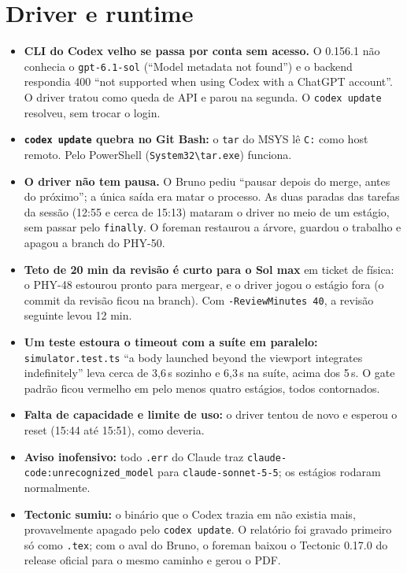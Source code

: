 \documentclass[11pt,a4paper]{article}
\begin{document}
\section{Driver e runtime}
\begin{itemize}
  \item \textbf{CLI do Codex velho se passa por conta sem acesso.} O 0.156.1
        não conhecia o \texttt{gpt-6.1-sol} (``Model metadata not found'') e o
        backend respondia 400 ``not supported when using Codex with a ChatGPT
        account''. O driver tratou como queda de API e parou na segunda. O
        \texttt{codex update} resolveu, sem trocar o login.
  \item \textbf{\texttt{codex update} quebra no Git Bash:} o \texttt{tar} do
        MSYS lê \texttt{C:} como host remoto. Pelo PowerShell
        (\texttt{System32\textbackslash tar.exe}) funciona.
  \item \textbf{O driver não tem pausa.} O Bruno pediu ``pausar depois do
        merge, antes do próximo''; a única saída era matar o processo. As duas
        paradas das tarefas da sessão (12:55 e cerca de 15:13) mataram o driver
        no meio de um estágio, sem passar pelo \texttt{finally}. O foreman
        restaurou a árvore, guardou o trabalho e apagou a branch do PHY-50.
  \item \textbf{Teto de 20 min da revisão é curto para o Sol max} em ticket de
        física: o PHY-48 estourou pronto para mergear, e o driver jogou o
        estágio fora (o commit da revisão ficou na branch). Com
        \texttt{-ReviewMinutes 40}, a revisão seguinte levou 12 min.
  \item \textbf{Um teste estoura o timeout com a suíte em paralelo:}
        \texttt{simulator.test.ts} ``a body launched beyond the viewport
        integrates indefinitely'' leva cerca de 3,6\,s sozinho e 6,3\,s na suíte,
        acima dos 5\,s. O gate padrão ficou vermelho em pelo menos quatro
        estágios, todos contornados.
  \item \textbf{Falta de capacidade e limite de uso:} o driver tentou de novo e
        esperou o reset (15:44 até 15:51), como deveria.
  \item \textbf{Aviso inofensivo:} todo \texttt{.err} do Claude traz
        \texttt{claude-code:unrecognized\_model} para
        \texttt{claude-sonnet-5-5}; os estágios rodaram normalmente.
  \item \textbf{Tectonic sumiu:} o binário que o Codex trazia em
         não existia mais, provavelmente
        apagado pelo \texttt{codex update}. O relatório foi gravado primeiro só
        como \texttt{.tex}; com o aval do Bruno, o foreman baixou o Tectonic
        0.17.0 do release oficial para o mesmo caminho e gerou o PDF.
\end{itemize}
\end{document}
